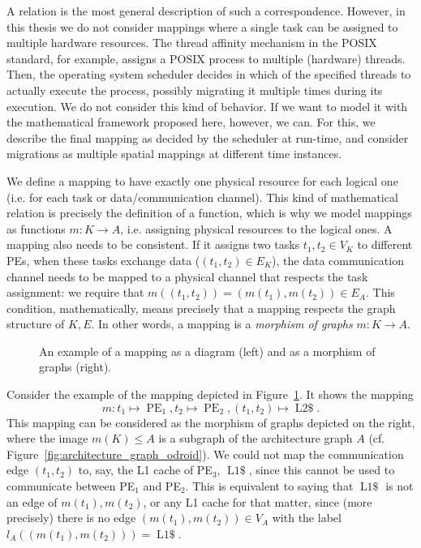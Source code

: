 A relation is the most general description of such a correspondence.
However, in this thesis we do not consider mappings where a single task can be assigned to multiple hardware resources.
The thread affinity mechanism in the POSIX standard, for example, assigns a POSIX process to multiple (hardware) threads.
Then, the operating system scheduler decides in which of the specified threads to actually execute the process, possibly migrating it multiple times during its execution.
We do not consider this kind of behavior.
If we want to model it with the mathematical framework proposed here, however, we can.
For this, we describe the final mapping as decided by the scheduler at run-time, and consider migrations as multiple spatial mappings at different time instances.

We define a mapping to have exactly one physical resource for each logical one (i.e. for each task or data/communication channel).
This kind of mathematical relation is precisely the definition of a function, which is why we model mappings as functions $m : K \rightarrow A$, i.e. assigning physical resources to the logical ones.
A mapping also needs to be consistent. If it assigns two tasks $t_1,t_2 \in V_K$ to different \acp{PE}, when these tasks exchange data ($(t_1,t_2) \in E_K$), the data communication channel needs to be mapped to a physical channel that respects the task assignment: we require that $m((t_1,t_2)) = (m(t_1),m(t_2)) \in E_A$.
This condition, mathematically, means precisely that a mapping respects the graph structure of $K,E$. In other words, a mapping is a \emph{morphism of graphs} $m : K \rightarrow A$.

\begin{figure}[h]
	\centering
\resizebox{0.8\textwidth}{!}{
   \begin{tikzpicture}
     
   \end{tikzpicture}
 }
   \caption{An example of a mapping as a diagram (left) and as a morphism of graphs (right).}
   \label{fig:mapping_example}
\end{figure}

Consider the example of the mapping depicted in Figure~\ref{fig:mapping_example}. It shows the mapping
\[ m : t_1 \mapsto \operatorname{PE}_1,t_2 \mapsto \operatorname{PE}_2, (t_1,t_2) \mapsto \operatorname{L2\$}.\]
This mapping can be considered as the morphism of graphs depicted on the right, where the image $m(K) \leq A$ is a subgraph of the architecture graph $A$ (cf. Figure~\ref{fig:architecture_graph_odroid}).
We could not map the communication edge $(t_1,t_2)$ to, say, the L1 cache of PE$_3$, $\operatorname{L1\$}$, since this cannot be used to communicate between PE$_1$ and PE$_2$.
This is equivalent to saying that $\operatorname{L1\$}$ is not an edge of $m(t_1),m(t_2)$, or any L1 cache for that matter, since (more precisely) there is no edge $(m(t_1),m(t_2)) \in V_A$ with the label $l_A((m(t_1),m(t_2))) = \operatorname{L1\$}$.

